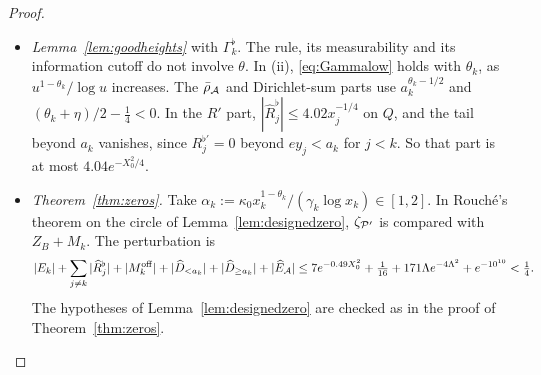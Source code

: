 \begin{proof}
\begin{itemize}
$|\widehat D_{\ge a_k}|\le171\Lambda e^{8\ell_k^2-\theta_k\log x_k}=171\Lambda e^{-\ell_k^2}\le171\Lambda e^{-4\Lambda^2}$.
This is where the exact form \eqref{eq:Dmaxstd} of the lag bound is needed.
\item \emph{Lemma~\ref{lem:goodheights}} with $\Gamma_k^\flat$. The rule, its measurability and its information cutoff do not involve
$\theta$. In (ii), \eqref{eq:Gammalow} holds with $\theta_k$, as $u^{1-\theta_k}/\log u$ increases. The $\bar\rho_{\mathcal{A}}$ and Dirichlet-sum parts
use $a_k^{\theta_k-1/2}$ and $(\theta_k+\eta)/2-\frac14<0$. In the $R'$ part, $|\widehat R_j^\flat|\le4.02x_j^{-1/4}$ on $Q$, and the tail
beyond $a_k$ vanishes, since $R_j^{\flat\prime}=0$ beyond $ey_j<a_k$ for $j<k$. So that part is at most $4.04e^{-X_0^2/4}$.
\item \emph{Theorem~\ref{thm:zeros}.} Take $\alpha_k:=\kappa_0x_k^{1-\theta_k}/(\gamma_k\log x_k)\in[1,2]$. In Rouch\'e's theorem on the circle
of Lemma~\ref{lem:designedzero}, $\zeta_{\mathcal{P}'}$ is compared with $Z_B+M_k$. The perturbation is
\[
  |E_k|+\sum_{j\ne k}|\widehat R_j^\flat|+|M_k^{\mathrm{off}}|+|\widehat D_{<a_k}|+|\widehat D_{\ge a_k}|+|\widehat E_{\mathcal{A}}|
  \le7e^{-0.49X_0^2}+\tfrac1{16}+171\Lambda e^{-4\Lambda^2}+e^{-10^{10}}<\tfrac14 .
\]
The hypotheses of Lemma~\ref{lem:designedzero} are checked as in the proof of Theorem~\ref{thm:zeros}.\qedhere
\end{itemize}
\end{proof}

